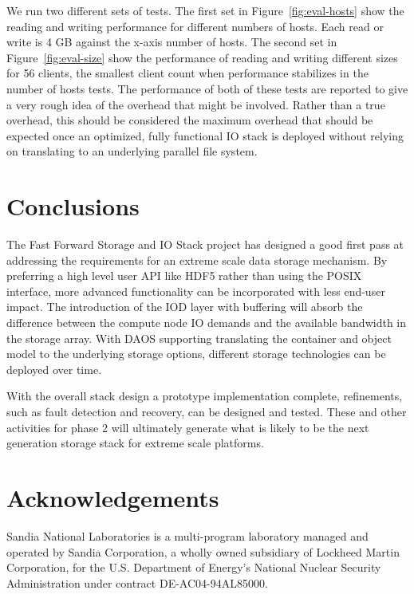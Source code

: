 \documentclass[conference]{IEEEtran} \pdfpagewidth=8.5in
\begin{document}
We run two different sets of tests. The first set in
Figure~\ref{fig:eval-hosts} show the reading and writing performance for
different numbers of hosts. Each read or write is 4 GB against the x-axis
number of hosts. The second set in Figure~\ref{fig:eval-size} show the
performance of reading and writing different sizes for 56 clients, the smallest
client count when performance stabilizes in the number of hosts tests.  The
performance of both of these tests are reported to give a very rough idea of
the overhead that might be involved. Rather than a true overhead, this should
be considered the maximum overhead that should be expected once an optimized,
fully functional IO stack is deployed without relying on translating to an
underlying parallel file system. 

\section{Conclusions}
\label{sec:conclusion}

The Fast Forward Storage and IO Stack project has designed a good first pass at
addressing the requirements for an extreme scale data storage mechanism.  By
preferring a high level user API like HDF5 rather than using the POSIX
interface, more advanced functionality can be incorporated with less end-user
impact. The introduction of the IOD layer with buffering will absorb the
difference between the compute node IO demands and the available bandwidth in
the storage array. With DAOS supporting translating the container and object
model to the underlying storage options, different storage technologies can be
deployed over time.

With the overall stack design a prototype implementation complete, refinements,
such as fault detection and recovery, can be designed and tested.  These and
other activities for phase 2 will ultimately generate what is likely to be the
next generation storage stack for extreme scale platforms.

\section{Acknowledgements}

Sandia National Laboratories is a multi-program laboratory managed and operated
by Sandia Corporation, a wholly owned subsidiary of Lockheed Martin
Corporation, for the U.S. Department of Energy's National Nuclear Security
Administration under contract DE-AC04-94AL85000.




\vfill\eject
\end{document}

